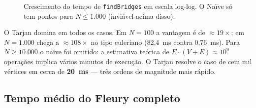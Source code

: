 \documentclass[12pt]{article}
\begin{document}
\begin{figure}[H]
\centering
{}
\caption{Crescimento do tempo de \texttt{findBridges} em escala log-log.
O Naïve só tem pontos para $N \le 1.000$ (inviável acima disso).}
\label{fig:bridges}
\end{figure}

O Tarjan domina em todos os casos. Em $N=100$ a vantagem é de
$\approx 19{\times}$; em $N=1.000$ chega a $\approx 108{\times}$ no tipo
euleriano (82{,}4~ms contra 0{,}76~ms). Para $N \ge 10.000$ o naïve foi
omitido: a estimativa teórica de $E \cdot (V{+}E) \approx 10^9$ operações
implica vários minutos de execução. O Tarjan resolve o caso de cem mil
vértices em cerca de \textbf{20~ms} --- três ordens de magnitude mais
rápido.

\subsection{Tempo médio do Fleury completo}
\end{document}

